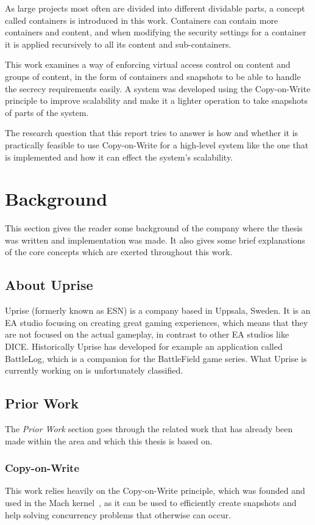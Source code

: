 \documentclass[a4paper,12pt]{article}
\begin{document}
As large projects most often are divided into different dividable parts, a concept called containers
is introduced in this work. Containers can contain more containers and content, and when
modifying the security settings for a container it is applied recursively to all its content and
sub-containers.

This work examines a way of enforcing virtual access control on content and groups of content, in
the form of containers and snapshots to be able to handle the secrecy requirements easily. A system
was developed using the Copy-on-Write principle to improve scalability and make it a lighter
operation to take snapshots of parts of the system. 

The research question that this report tries to answer is how and whether it is practically 
feasible to use Copy-on-Write for a high-level system like the one that is implemented and how 
it can effect the system's scalability. 

\newpage
\section{Background}
This section gives the reader some background of the company where the thesis was written and
implementation was made. It also gives some brief explanations of the core concepts which are 
exerted throughout this work. 

\subsection{About Uprise}
Uprise (formerly known as ESN) is a company based in Uppsala, Sweden. It is an EA studio focusing on
creating great gaming experiences, which means that they are not focused on the actual gameplay, in
contrast to other EA studios like DICE. Historically Uprise has developed for example an
application called BattleLog, which is a companion for the BattleField game series. What Uprise is
currently working on is unfortunately classified.

\subsection{Prior Work}
The \textit{Prior Work} section goes through the related work that has already been made within the
area and which this thesis is based on.

\subsubsection{Copy-on-Write}
This work relies heavily on the Copy-on-Write principle, which was founded and used in the Mach
kernel~\cite{COPYONWRITE}, as it can be used to efficiently create snapshots and help solving
concurrency problems that otherwise can occur.
\end{document}
